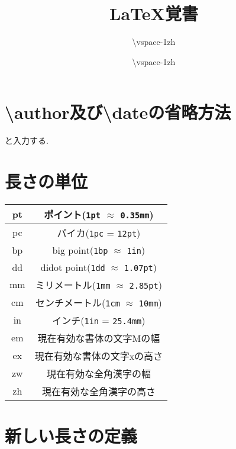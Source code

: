 \documentclass[12pt]{ltjsarticle}
\title{\LaTeX 覚書}
\author{\vspace{-1\zh}}\date{\vspace{-1\zh}}
\begin{document}
  \maketitle
  \tableofcontents
  \clearpage

  \section{\textbackslash author及び\textbackslash dateの省略方法}

  \begin{excode}
      \author{\textbackslash vspace{-1zh}}
      \date{\textbackslash vspace{-1zh}}
  \end{excode}
  と入力する.

  \section{長さの単位}

  \begin{table}[H]
  	\centering

  	\begin{tabular}{|c|c|} \hline
  		pt & ポイント(\verb|1pt| $\approx$ \verb|0.35mm|) \\ \hline
  		pc & パイカ(\verb|1pc| = \verb|12pt|) \\ \hline
  		bp & big point(\verb|1bp| $\approx$ \verb|1in|) \\ \hline
  		dd & didot point(\verb|1dd| $\approx$ \verb|1.07pt|) \\ \hline
  		mm & ミリメートル(\verb|1mm| $\approx$ \verb|2.85pt|) \\ \hline
  		cm & センチメートル(\verb|1cm| $\approx$ \verb|10mm|) \\ \hline
  		in & インチ(\verb|1in| = \verb|25.4mm|) \\ \hline
  		em & 現在有効な書体の文字Mの幅 \\ \hline
  		ex & 現在有効な書体の文字xの高さ \\ \hline
  		zw & 現在有効な全角漢字の幅 \\ \hline
  		zh & 現在有効な全角漢字の高さ \\ \hline
  	\end{tabular}
  \end{table}

  \section{新しい長さの定義}
\end{document}
